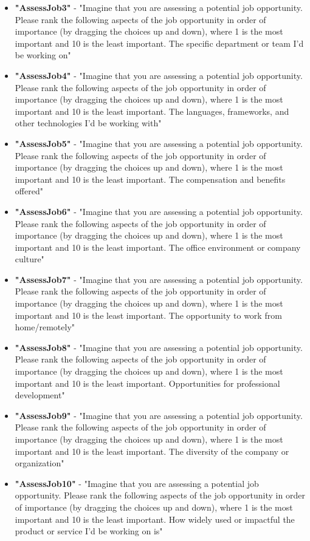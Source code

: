 \begin{appendices}
\begin{itemize}
        \item \textbf{"AssessJob3"} - "Imagine that you are assessing a potential job opportunity. Please rank the following aspects of the job opportunity in order of importance (by dragging the choices up and down), where 1 is the most important and 10 is the least important. The specific department or team I'd be working on"
        \item \textbf{"AssessJob4"} - "Imagine that you are assessing a potential job opportunity. Please rank the following aspects of the job opportunity in order of importance (by dragging the choices up and down), where 1 is the most important and 10 is the least important. The languages, frameworks, and other technologies I'd be working with"
        \item \textbf{"AssessJob5"} - "Imagine that you are assessing a potential job opportunity. Please rank the following aspects of the job opportunity in order of importance (by dragging the choices up and down), where 1 is the most important and 10 is the least important. The compensation and benefits offered"
        \item \textbf{"AssessJob6"} - "Imagine that you are assessing a potential job opportunity. Please rank the following aspects of the job opportunity in order of importance (by dragging the choices up and down), where 1 is the most important and 10 is the least important. The office environment or company culture"
        \item \textbf{"AssessJob7"} - "Imagine that you are assessing a potential job opportunity. Please rank the following aspects of the job opportunity in order of importance (by dragging the choices up and down), where 1 is the most important and 10 is the least important. The opportunity to work from home/remotely"
        \item \textbf{"AssessJob8"} - "Imagine that you are assessing a potential job opportunity. Please rank the following aspects of the job opportunity in order of importance (by dragging the choices up and down), where 1 is the most important and 10 is the least important. Opportunities for professional development"
        \item \textbf{"AssessJob9"} - "Imagine that you are assessing a potential job opportunity. Please rank the following aspects of the job opportunity in order of importance (by dragging the choices up and down), where 1 is the most important and 10 is the least important. The diversity of the company or organization"
        \item \textbf{"AssessJob10"} - "Imagine that you are assessing a potential job opportunity. Please rank the following aspects of the job opportunity in order of importance (by dragging the choices up and down), where 1 is the most important and 10 is the least important. How widely used or impactful the product or service I'd be working on is"

\end{itemize}
\end{appendices}

